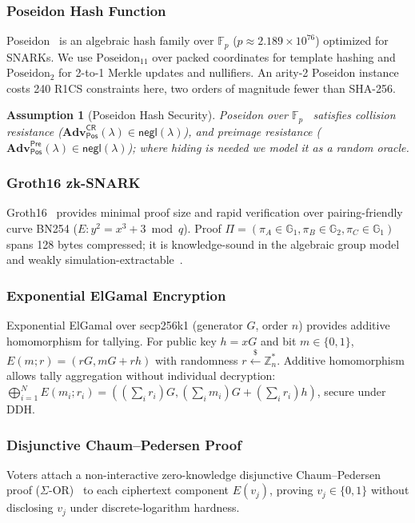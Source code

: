 \documentclass[10pt,letterpaper,journal]{IEEEtran}
\newtheorem{assumption}[theorem]{Assumption}
\begin{document}
\subsubsection{Poseidon Hash Function}
Poseidon~\cite{Grassi2021} is an algebraic hash family over $\mathbb{F}_p$ ($p \approx 2.189 \times 10^{76}$) optimized for SNARKs. We use $\text{Poseidon}_{11}$ over packed coordinates for template hashing and $\text{Poseidon}_2$ for 2-to-1 Merkle updates and nullifiers. An arity-2 Poseidon instance costs 240 R1CS constraints here, two orders of magnitude fewer than SHA-256.

\begin{assumption}[Poseidon Hash Security]
\label{asm:poseidon}
Poseidon over $\mathbb{F}_p$~\cite{Grassi2021} satisfies collision resistance ($\mathbf{Adv}^{\mathsf{CR}}_{\mathsf{Pos}}(\lambda) \in \mathsf{negl}(\lambda)$), and preimage resistance ($\mathbf{Adv}^{\mathsf{Pre}}_{\mathsf{Pos}}(\lambda) \in \mathsf{negl}(\lambda)$); where hiding is needed we model it as a random oracle.
\end{assumption}

\subsubsection{Groth16 zk-SNARK}
Groth16~\cite{Groth2016} provides minimal proof size and rapid verification over pairing-friendly curve BN254 ($E: y^2 = x^3 + 3 \bmod q$). Proof $\Pi = (\pi_A \in \mathbb{G}_1, \pi_B \in \mathbb{G}_2, \pi_C \in \mathbb{G}_1)$ spans 128 bytes compressed; it is knowledge-sound in the algebraic group model~\cite{Fuchsbauer2018} and weakly simulation-extractable~\cite{Baghery2021}.

\subsubsection{Exponential ElGamal Encryption}
Exponential ElGamal over secp256k1 (generator $G$, order $n$) provides additive homomorphism for tallying. For public key $h = xG$ and bit $m \in \{0, 1\}$, $E(m; r) = (rG, mG + rh)$ with randomness $r \xleftarrow{\$} \mathbb{Z}_n^*$. Additive homomorphism allows tally aggregation without individual decryption: $\bigoplus_{i=1}^{N} E(m_i; r_i) = ((\sum_i r_i)G, (\sum_i m_i)G + (\sum_i r_i)h)$, secure under DDH.

\subsubsection{Disjunctive Chaum--Pedersen Proof}
Voters attach a non-interactive zero-knowledge disjunctive Chaum--Pedersen proof ($\Sigma$-OR)~\cite{ChaumPedersen1992} to each ciphertext component $E(v_j)$, proving $v_j \in \{0, 1\}$ without disclosing $v_j$ under discrete-logarithm hardness.
\end{document}

